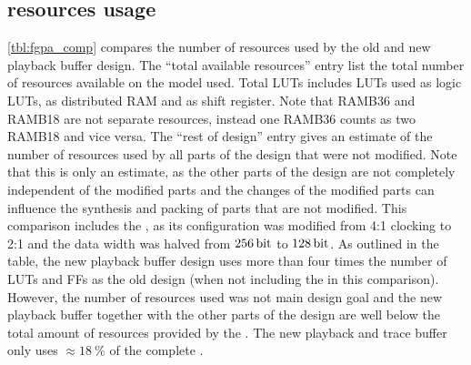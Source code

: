 \subsection{\FPGA{} resources usage}
\autoref{tbl:fgpa_comp} compares the number of \FPGA{} resources used by the old and new playback buffer design. The ``total available resources'' entry list the total number of resources available on the \FPGA{} model used. Total LUTs includes LUTs used as logic LUTs, as distributed RAM and as shift register. Note that RAMB36 and RAMB18 are not separate resources, instead one RAMB36 counts as two RAMB18 and vice versa.
The ``rest of \FPGA{} design'' entry gives an estimate of the number of resources used by all parts of the \FPGA{} design that were not modified. Note that this is only an estimate, as the other parts of the design are not completely independent of the modified parts and the changes of the modified parts can influence the synthesis and packing of parts that are not modified.
This comparison includes the \XilinxMIG{}, as its configuration was modified from 4:1 clocking to 2:1 and the data width was halved from $\SI{256}{\bit}$ to $\SI{128}{\bit}$.
As outlined in the table, the new playback buffer design uses more than four times the number of LUTs and FFs as the old design (when not including the \MIG{} in this comparison). However, the number of resources used was not main design goal and the new playback buffer together with the other parts of the \FPGA{} design are well below the total amount of resources provided by the \FPGA{}. The new playback and trace buffer only uses $\approx\SI{18}{\percent}$ of the complete \FPGA{}.
